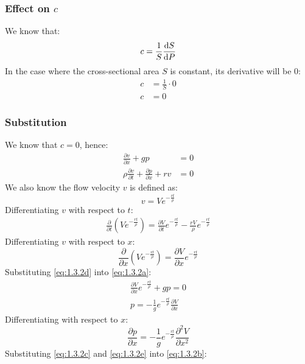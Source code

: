 \documentclass[11pt]{article}
\numberwithin{equation}{section}
\begin{document}
\subsubsection{Effect on $c$}
We know that:
\begin{equation}
    c = \frac{1}{S}\frac{\dif S}{\dif P}
\end{equation}
In the case where the cross-sectional area $S$ is constant, its derivative will be 0:
\begin{align}
    c &= \frac{1}{S} \cdot 0\\
    c &= 0
\end{align}
\subsubsection{Substitution}
We know that $c = 0$, hence:
\begin{align}
    \frac{\partial v}{\partial x} + gp &= 0 \label{eq:1.3.2a}\\
    \rho \frac{\partial v}{\partial t} + \frac{\partial p}{\partial x}+ rv &= 0 \label{eq:1.3.2b}
\end{align}
We also know the flow velocity $v$ is defined as:
\begin{equation}
    v = V e^{-\frac{rt}{\rho}}
\end{equation}
Differentiating $v$ with respect to $t$:
\begin{align}
    \frac{\partial }{\partial t} \left(V e^{-\frac{rt}{\rho}}\right) = \frac{\partial V }{\partial t} e^{-\frac{rt}{\rho}} - \frac{rV}{\rho} e^{-\frac{rt}{\rho}} \label{eq:1.3.2c}
\end{align}
Differentiating $v$ with respect to $x$:
\begin{equation}
    \frac{\partial }{\partial x} \left(V e^{-\frac{rt}{\rho}}\right) = \frac{\partial V}{\partial x} e^{-\frac{rt}{\rho}} \label{eq:1.3.2d}
\end{equation}
Substituting \ref{eq:1.3.2d} into \ref{eq:1.3.2a}:
\begin{gather}
    \frac{\partial V}{\partial x} e^{-\frac{rt}{\rho}} + gp = 0\\
    p = -\frac{1}{g}e^{-\frac{rt}{\rho}}\frac{\partial V}{\partial x}
\end{gather}
Differentiating with respect to $x$:
\begin{equation}
    \frac{\partial p}{\partial x} = - \frac{1}{g}e^{-\frac{rt}{\rho}}\frac{\partial^2 V}{\partial x^2} \label{eq:1.3.2e}
\end{equation}
Substituting \ref{eq:1.3.2c} and \ref{eq:1.3.2e} into \ref{eq:1.3.2b}:
\end{document}
